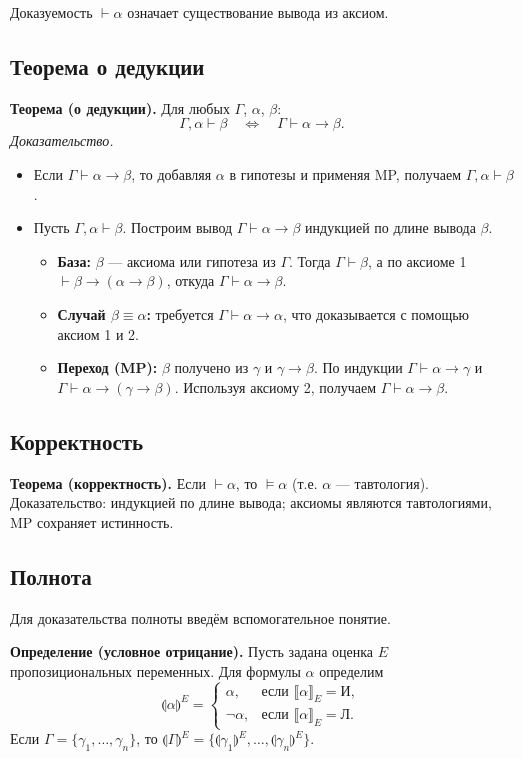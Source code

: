 \documentclass[10pt]{article}
\begin{document}
Доказуемость $\vdash\alpha$ означает существование вывода из аксиом.

\subsection{Теорема о дедукции}
\textbf{Теорема (о дедукции).} Для любых $\Gamma$, $\alpha$, $\beta$:
\[
\Gamma,\alpha\vdash\beta \quad\Longleftrightarrow\quad \Gamma\vdash\alpha\rightarrow\beta.
\]
\emph{Доказательство.}
\begin{itemize}
  \item[($\Rightarrow$)] Если $\Gamma\vdash\alpha\rightarrow\beta$, то добавляя $\alpha$ в гипотезы и применяя MP, получаем $\Gamma,\alpha\vdash\beta$.
  \item[($\Leftarrow$)] Пусть $\Gamma,\alpha\vdash\beta$. Построим вывод $\Gamma\vdash\alpha\rightarrow\beta$ индукцией по длине вывода $\beta$.
    \begin{itemize}
      \item \textbf{База:} $\beta$ — аксиома или гипотеза из $\Gamma$. Тогда $\Gamma\vdash\beta$, а по аксиоме 1 $\vdash\beta\rightarrow(\alpha\rightarrow\beta)$, откуда $\Gamma\vdash\alpha\rightarrow\beta$.
      \item \textbf{Случай $\beta\equiv\alpha$:} требуется $\Gamma\vdash\alpha\rightarrow\alpha$, что доказывается с помощью аксиом 1 и 2.
      \item \textbf{Переход (MP):} $\beta$ получено из $\gamma$ и $\gamma\rightarrow\beta$. По индукции $\Gamma\vdash\alpha\rightarrow\gamma$ и $\Gamma\vdash\alpha\rightarrow(\gamma\rightarrow\beta)$. Используя аксиому 2, получаем $\Gamma\vdash\alpha\rightarrow\beta$.
    \end{itemize}
\end{itemize}

\subsection{Корректность}
\textbf{Теорема (корректность).} Если $\vdash\alpha$, то $\models\alpha$ (т.е. $\alpha$ — тавтология).
Доказательство: индукцией по длине вывода; аксиомы являются тавтологиями, MP сохраняет истинность.

\subsection{Полнота}
Для доказательства полноты введём вспомогательное понятие.

\textbf{Определение (условное отрицание).} Пусть задана оценка $E$ пропозициональных переменных. Для формулы $\alpha$ определим
\[
\llparenthesis\alpha\rrparenthesis^E = 
\begin{cases}
\alpha, & \text{если } \llbracket\alpha\rrbracket_E = \text{И},\\
\neg\alpha, & \text{если } \llbracket\alpha\rrbracket_E = \text{Л}.
\end{cases}
\]
Если $\Gamma = \{\gamma_1,\dots,\gamma_n\}$, то $\llparenthesis\Gamma\rrparenthesis^E = \{\llparenthesis\gamma_1\rrparenthesis^E,\dots,\llparenthesis\gamma_n\rrparenthesis^E\}$.
\end{document}
